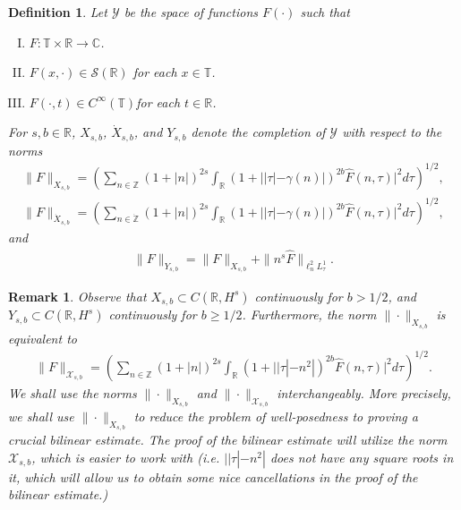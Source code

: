 \documentclass[12pt,reqno]{amsart}
\numberwithin{equation}{section}  %
\newcommand{\rr}{\mathbb{R}}
\newcommand{\zz}{\mathbb{Z}}
\newcommand{\cc}{\mathbb{C}}
\newcommand{\ci}{\mathbb{T}}
\newcommand{\zzdot}{\dot{\zz}}
\newcommand{\wh}{\widehat}
\newtheorem{definition}[theorem]{Definition}
\newtheorem{remark}[theorem]{Remark}
\begin{document}
\begin{definition}
  Let $\mathcal{Y}$ be the space of functions $F(\cdot)$ such that
  \begin{enumerate}[(I)]
   \item{$F: \ci \times \rr \to \cc$}.
   \item{$F(x, \cdot) \in \mathcal{S}(\rr)$ for each $x \in \ci$}.
   \item{$F(\cdot, t) \in C^{\infty}(\ci)$for each $t \in \rr$}.
  \end{enumerate}
  For $s, b \in \rr$, $X_{s,b}$, $\dot{X}_{s,b}$, and $Y_{s,b}$ denote the completion of $\mathcal{Y}$ with
  respect to the norms
  \begin{equation}
  \begin{split}
    \|F\|_{X_{s,b}} = \left( \sum_{n \in \zz} (1 + |n|)^{2s} \int_{\rr}
    (1 + ||\tau| - \gamma(n) |)^{2b} \wh{F}(n, \tau)|^{2} d \tau\right)^{1/2},
  \end{split}
  \label{eqn:bous-norm}
  \end{equation}
  \begin{equation*}
  \begin{split}
    \|F\|_{\dot{X}_{s,b}} = \left( \sum_{n \in \zzdot} (1 + |n|)^{2s} \int_{\rr}
    (1 + ||\tau| - \gamma(n) |)^{2b} \wh{F}(n, \tau)|^{2} d \tau\right)^{1/2},
  \end{split}
  \end{equation*}
  and
  \begin{equation*}
  \begin{split}
    \|F\|_{Y_{s,b}} = \|F\|_{X_{s,b}} + \|n^s \wh{F}\|_{\ell^{2}_{n} L^1_\tau }.
  \end{split}
  \end{equation*}
\end{definition}
%
\begin{remark}
  Observe that $X_{s,b} \subset C(\rr, H^{s})$ continuously for $b>1/2$, and $Y_{s,b} \subset C(\rr, H^{s})$ continuously for $b\ge1/2$. Furthermore, the norm $\| \cdot \|_{X_{s,b}}$ is equivalent to
  \begin{equation*}
  \begin{split}
    \| F \|_{\mathcal{X}_{s,b}}
    = \left( \sum_{n \in \zz} (1 + |n|)^{2s} \int_{\rr}
    (1 + ||\tau| - n^{2} |)^{2b} \wh{F}(n, \tau)|^{2} d \tau\right)^{1/2}.
  \end{split}
  \end{equation*}
  We shall use the norms $\| \cdot \|_{X_{s,b}}$ and $\| \cdot \|_{\mathcal{X}_{s,b}}$ interchangeably. More precisely, we shall use $\| \cdot \|_{X_{s,b}}$ to reduce the problem of well-posedness to proving a crucial bilinear estimate. The proof of the bilinear estimate will utilize the norm $\mathcal{X}_{s,b}$, which is easier to work with (i.e. $ | | \tau | - n^{2} |$ does not have any square roots in it, which will allow us to obtain some nice cancellations in the proof of the bilinear estimate.)   
\end{remark}
\end{document}
